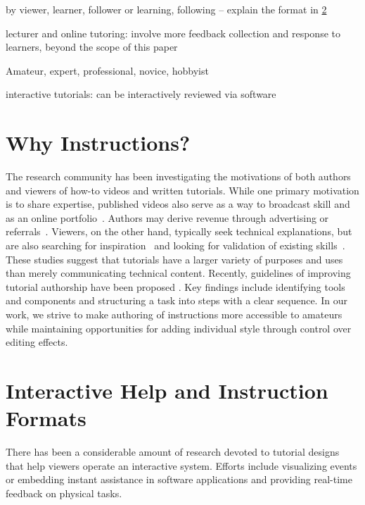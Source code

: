 by viewer, learner, follower
or learning, following -- explain the format in \ref{background_format}

lecturer and online tutoring: involve more feedback collection and response to learners, beyond the scope of this paper

Amateur, expert, professional, novice, hobbyist

interactive tutorials: can be interactively reviewed via software


\section{Why Instructions?}
\label{background_why}

The research community has been investigating the motivations of both authors and viewers of how-to videos and written tutorials. While one primary motivation is to share expertise, published videos also serve as a way to broadcast skill and as an online portfolio~\cite{Torrey:2007he,Kuznetsov:2010:REA:1868914.1868950}. Authors may derive revenue through advertising or referrals~\cite{Lafreniere:2012tl}. Viewers, on the other hand, typically seek technical explanations, but are also searching for inspiration~\cite{Torrey:2009fc} and looking for validation of existing skills~\cite{Lafreniere:2012tl}.
%
These studies suggest that tutorials have a larger variety of purposes and uses than merely communicating technical content. Recently, guidelines of improving tutorial authorship have been proposed \cite{Wakkary:2015:TAH:2702123.2702550}. Key findings include identifying tools and components and structuring a task into steps with a clear sequence. In our work, we strive to make authoring of instructions more accessible to amateurs while maintaining opportunities for adding individual style through control over editing effects.



\section{Interactive Help and Instruction Formats}
\label{background_format}

There has been a considerable amount of research devoted to tutorial designs that help viewers operate an interactive system. Efforts include visualizing events or embedding instant assistance in software applications and providing real-time feedback on physical tasks.

